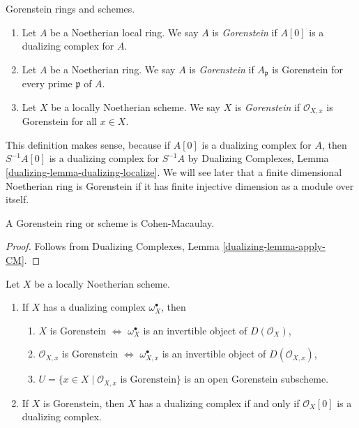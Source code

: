 \begin{definition}
\label{definition-gorenstein}
Gorenstein rings and schemes.
\begin{enumerate}
\item Let $A$ be a Noetherian local ring. We say $A$ is {\it Gorenstein}
if $A[0]$ is a dualizing complex for $A$.
\item Let $A$ be a Noetherian ring. We say $A$ is {\it Gorenstein}
if $A_\mathfrak p$ is Gorenstein for every prime $\mathfrak p$ of $A$.
\item Let $X$ be a locally Noetherian scheme. We say $X$ is {\it Gorenstein}
if $\mathcal{O}_{X, x}$ is Gorenstein for all $x \in X$.
\end{enumerate}
\end{definition}

\noindent
This definition makes sense, because if $A[0]$ is a dualizing complex
for $A$, then $S^{-1}A[0]$ is a dualizing complex for $S^{-1}A$ by
Dualizing Complexes, Lemma \ref{dualizing-lemma-dualizing-localize}.
We will see later that a finite dimensional Noetherian ring is Gorenstein
if it has finite injective dimension as a module over itself.

\begin{lemma}
\label{lemma-gorenstein-CM}
A Gorenstein ring or scheme is Cohen-Macaulay.
\end{lemma}

\begin{proof}
Follows from
Dualizing Complexes, Lemma \ref{dualizing-lemma-apply-CM}.
\end{proof}

\begin{lemma}
\label{lemma-gorenstein}
Let $X$ be a locally Noetherian scheme.
\begin{enumerate}
\item If $X$ has a dualizing complex $\omega_X^\bullet$, then
\begin{enumerate}
\item $X$ is Gorenstein $\Leftrightarrow$ $\omega_X^\bullet$ is an invertible
object of $D(\mathcal{O}_X)$,
\item $\mathcal{O}_{X, x}$ is Gorenstein $\Leftrightarrow$
$\omega_{X, x}^\bullet$ is an invertible object of $D(\mathcal{O}_{X, x})$,
\item $U = \{x \in X \mid \mathcal{O}_{X, x}\text{ is Gorenstein}\}$
is an open Gorenstein subscheme.
\end{enumerate}
\item If $X$ is Gorenstein, then $X$ has a dualizing complex if and
only if $\mathcal{O}_X[0]$ is a dualizing complex.
\end{enumerate}
\end{lemma}


